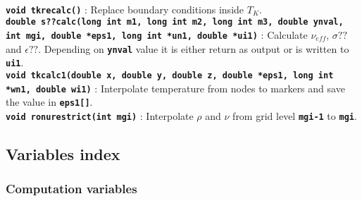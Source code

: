 \\
\textbf{\texttt{void tkrecalc()}} : Replace boundary conditions inside $T_K$.  
\\
\textbf{\texttt{double s??calc(long int m1, long int m2, long int m3, double ynval, int mgi, double *eps1, long int *un1, double *ui1)}} : Calculate $\nu_{eff}$, $\sigma??$ and $\epsilon??$. Depending on \textbf{\texttt{ynval}} value it is either return as output or is written to \textbf{\texttt{ui1}}.  
\\
\textbf{\texttt{void tkcalc1(double x, double y, double z, double *eps1, long int *wn1, double wi1)}} : Interpolate temperature from nodes to markers and save the value in \textbf{\texttt{eps1[]}}.  
\\
\textbf{\texttt{void ronurestrict(int mgi)}} : Interpolate $\rho$ and $\nu$ from grid level \textbf{\texttt{mgi-1}} to \textbf{\texttt{mgi}}.  
\\

\subsection{Variables index}

\subsubsection{Computation variables}


